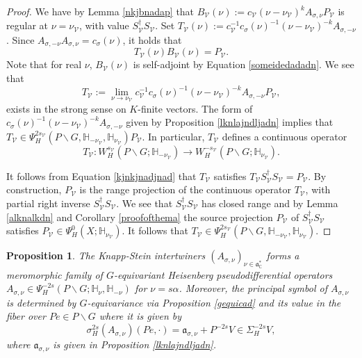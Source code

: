 \documentclass[a4paper,reqno]{amsart}
\numberwithin{equation}{section}
\def\C{\mathbb{C}}
\newtheorem{prop}[thm]{Proposition}
\theoremstyle{definition}
\theoremstyle{remark}
\begin{document}
\begin{proof}
We have by Lemma \ref{nkjbnadap} that $B_\mathcal{V}(\nu):=c_\mathcal{V}(\nu-\nu_{\mathcal{V}})^kA_{\sigma,\nu}P_\mathcal{V}$ is regular at $\nu=\nu_{\mathcal{V}}$, with value $S_{\mathcal{V}}^\dagger S_{\mathcal{V}}$. Set $T_\mathcal{V}(\nu):= c_\mathcal{V}^{-1}c_\sigma(\nu)^{-1}(\nu-\nu_{\mathcal{V}})^{-k}A_{\sigma,-\nu}$. Since $A_{\sigma,-\nu}A_{\sigma,\nu}=c_\sigma(\nu)$,  it holds that
\begin{equation}
\label{kjnkjnadjnad}
T_\mathcal{V}(\nu)B_\mathcal{V}(\nu)=P_\mathcal{V}.
\end{equation}
Note that for real $\nu$, $B_\mathcal{V}(\nu)$ is self-adjoint by Equation \eqref{someidedadadn}. We see that 
$$T_\mathcal{V}:=\lim_{\nu\to \nu_{\mathcal{V}}} c_\mathcal{V}^{-1}c_\sigma(\nu)^{-1}(\nu-\nu_{\mathcal{V}})^{-k}A_{\sigma,-\nu}P_\mathcal{V},$$
exists in the strong sense on $K$-finite vectors. The form of $c_\sigma(\nu)^{-1}(\nu-\nu_{\mathcal{V}})^{-k}A_{\sigma,-\nu}$ given by Proposition \ref{lknlajndljadn} implies that $T_\mathcal{V}\in \Psi^{2s_\mathcal{V}}_H(P\backslash G,\mathbb{H}_{-\nu_{\mathcal{V}}},\mathbb{H}_{\nu_{\mathcal{V}}})P_\mathcal{V}$. In particular, $T_\mathcal{V}$ defines a continuous operator 
$$T_\mathcal{V}:W^{s_\mathcal{V}}_H(P\backslash G; \mathbb{H}_{-\nu_{\mathcal{V}}})\to W^{-s_\mathcal{V}}_H(P\backslash G; \mathbb{H}_{\nu_{\mathcal{V}}}).$$

It follows from Equation \eqref{kjnkjnadjnad} that $T_\mathcal{V}$ satisfies $T_\mathcal{V}S_{\mathcal{V}}^\dagger S_{\mathcal{V}}=P_\mathcal{V}$. By construction, $P_\mathcal{V}$ is the range projection of the continuous operator $T_{\mathcal{V}}$, with partial right inverse $S_{\mathcal{V}}^\dagger S_{\mathcal{V}}$. We see that   $S_{\mathcal{V}}^\dagger S_{\mathcal{V}}$ has closed range and by Lemma \ref{alknalkdn} and Corollary \ref{proofofthema} the source projection $P_\mathcal{V}$ of $S_{\mathcal{V}}^\dagger S_{\mathcal{V}}$ satisfies $P_{\mathcal{V}}\in \Psi^0_H(X;\mathbb{H}_{\nu_{\mathcal{V}}})$. It follows that $T_\mathcal{V}\in \Psi^{2s_\mathcal{V}}_H(P\backslash G,\mathbb{H}_{-\nu_{\mathcal{V}}},\mathbb{H}_{\nu_{\mathcal{V}}})$. 
\end{proof}

\begin{prop}
\label{nljnkjlnadkbiybg}
The Knapp-Stein intertwiners $(A_{\sigma,\nu})_{\nu \in \mathfrak{a}^*_\C}$ forms a meromorphic family of $G$-equivariant Heisenberg pseudodifferential operators $A_{\sigma,\nu}\in \Psi^{-2s}_H(P\backslash G; \mathbb{H}_\nu,\mathbb{H}_{-\nu})$ for $\nu=s\alpha$. Moreover, the principal symbol of $A_{\sigma,\nu}$ is determined by $G$-equivariance via Proposition \ref{gequicad} and its value in the fiber over $Pe\in P\backslash G$ where it is given by 
$$\sigma_H^{2s}(A_{\sigma,\nu})(Pe,\cdot)=\mathfrak{a}_{\sigma,\nu}+P^{-2s}V\in \Sigma_H^{-2s}V,$$
where $\mathfrak{a}_{\sigma,\nu}$ is given in Proposition \ref{lknlajndljadn}.
\end{prop}
\end{document}
